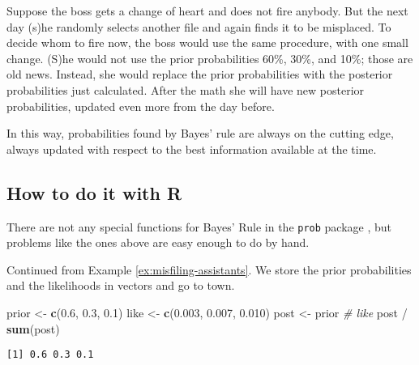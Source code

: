 \documentclass[]{book}
\newenvironment{Shaded}{\begin{snugshade}}{\end{snugshade}}
\newcommand{\KeywordTok}[1]{\textcolor[rgb]{0.13,0.29,0.53}{\textbf{{#1}}}}
\newcommand{\FloatTok}[1]{\textcolor[rgb]{0.00,0.00,0.81}{{#1}}}
\newcommand{\StringTok}[1]{\textcolor[rgb]{0.31,0.60,0.02}{{#1}}}
\newcommand{\CommentTok}[1]{\textcolor[rgb]{0.56,0.35,0.01}{\textit{{#1}}}}
\newcommand{\NormalTok}[1]{{#1}}
\numberwithin{equation}{chapter}
\numberwithin{figure}{chapter}
\theoremstyle{plain}
\theoremstyle{definition}
\theoremstyle{remark}
\theoremstyle{definition}
\theoremstyle{definition}
\theoremstyle{remark}
\let\BeginKnitrBlock\begin \let\EndKnitrBlock\end
\begin{document}
\bigskip

\BeginKnitrBlock{example}
\protect\hypertarget{ex:misfiling-assistants-multiple}{}{\label{ex:misfiling-assistants-multiple}}Suppose
the boss gets a change of heart and does not fire anybody. But the next
day (s)he randomly selects another file and again finds it to be
misplaced. To decide whom to fire now, the boss would use the same
procedure, with one small change. (S)he would not use the prior
probabilities 60\%, 30\%, and 10\%; those are old news. Instead, she
would replace the prior probabilities with the posterior probabilities
just calculated. After the math she will have new posterior
probabilities, updated even more from the day before.
\EndKnitrBlock{example}

In this way, probabilities found by Bayes' rule are always on the
cutting edge, always updated with respect to the best information
available at the time.

\subsection{How to do it with R}\label{how-to-do-it-with-r-18}

There are not any special functions for Bayes' Rule in the \texttt{prob}
package \autocite{prob}, but problems like the ones above are easy
enough to do by hand.

\bigskip

\BeginKnitrBlock{example}[Misfiling Assistants]
\protect\hypertarget{ex:unnamed-chunk-178}{}{\label{ex:unnamed-chunk-178}
\iffalse (Misfiling Assistants) \fi }Continued from Example
\ref{ex:misfiling-assistants}. We store the prior probabilities and the
likelihoods in vectors and go to town.
\EndKnitrBlock{example}

\begin{Shaded}
\begin{Highlighting}[]
\NormalTok{prior <-}\StringTok{ }\KeywordTok{c}\NormalTok{(}\FloatTok{0.6}\NormalTok{, }\FloatTok{0.3}\NormalTok{, }\FloatTok{0.1}\NormalTok{)}
\NormalTok{like <-}\StringTok{ }\KeywordTok{c}\NormalTok{(}\FloatTok{0.003}\NormalTok{, }\FloatTok{0.007}\NormalTok{, }\FloatTok{0.010}\NormalTok{)}
\NormalTok{post <-}\StringTok{ }\NormalTok{prior }\CommentTok{# like}
\NormalTok{post /}\StringTok{ }\KeywordTok{sum}\NormalTok{(post)}
\end{Highlighting}
\end{Shaded}

\begin{verbatim}
[1] 0.6 0.3 0.1
\end{verbatim}
\end{document}

